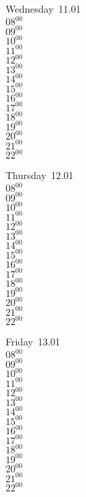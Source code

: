 \documentclass[11pt,a4paper]{book}\usepackage[]{graphicx}\usepackage[]{color}
\begin{document}
\begin{weekdaybox}
  Wednesday~11.01\\
  { 
  \vfill
  $08^{00}$\\
$09^{00}$\\
$10^{00}$\\
$11^{00}$\\
$12^{00}$\\
$13^{00}$\\
$14^{00}$\\
$15^{00}$\\
$16^{00}$\\
$17^{00}$\\
$18^{00}$\\
$19^{00}$\\
$20^{00}$\\
$21^{00}$\\
$22^{00}$\\
  }
\end{weekdaybox}
\clearpage
\begin{headerbox}
\end{headerbox}
\begin{weekdaybox}
  Thursday~12.01\\
  { 
  \vfill
  $08^{00}$\\
$09^{00}$\\
$10^{00}$\\
$11^{00}$\\
$12^{00}$\\
$13^{00}$\\
$14^{00}$\\
$15^{00}$\\
$16^{00}$\\
$17^{00}$\\
$18^{00}$\\
$19^{00}$\\
$20^{00}$\\
$21^{00}$\\
$22^{00}$\\
  }
\end{weekdaybox} 
\begin{weekdaybox}
  Friday~13.01\\
  { 
  \vfill
  $08^{00}$\\
$09^{00}$\\
$10^{00}$\\
$11^{00}$\\
$12^{00}$\\
$13^{00}$\\
$14^{00}$\\
$15^{00}$\\
$16^{00}$\\
$17^{00}$\\
$18^{00}$\\
$19^{00}$\\
$20^{00}$\\
$21^{00}$\\
$22^{00}$\\
  }
\end{weekdaybox}
\end{document}
